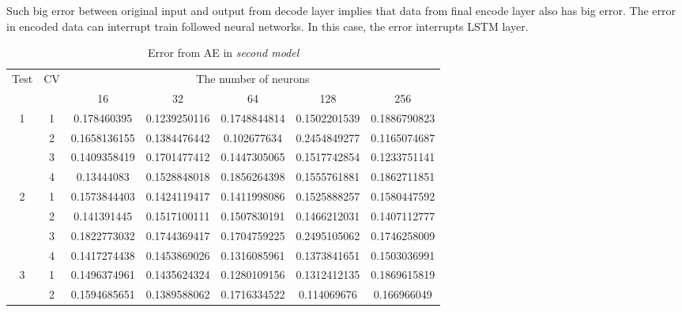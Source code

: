 \documentclass[draft,dvipsnames]{drexel-thesis}
\begin{document}
\begin{thesis}
Such big error between original input and output from decode layer implies that data from final encode layer also has big error. The error in encoded data can interrupt train followed neural networks. In this case, the error interrupts LSTM layer.


\begin{table}[!t]
\centering
\caption{Error from AE in {\em second model}}
\label{tbl:sae_error}
\begin{tabular}{|c|c|c|c|c|c|c|}
\hline
\multirow{2}{*}{Test} & \multirow{2}{*}{CV} & \multicolumn{5}{c|}{The number of neurons}                                   \\ \cline{3-7} 
                      &                     & 16            & 32            & 64            & 128           & 256          \\ \hline
\multirow{4}{*}{1}    & 1                   & 0.178460395   & 0.1239250116  & 0.1748844814  & 0.1502201539  & 0.1886790823 \\ \cline{2-7} 
                      & 2                   & 0.1658136155  & 0.1384476442  & 0.102677634   & 0.2454849277  & 0.1165074687 \\ \cline{2-7} 
                      & 3                   & 0.1409358419  & 0.1701477412  & 0.1447305065  & 0.1517742854  & 0.1233751141 \\ \cline{2-7} 
                      & 4                   & 0.13444083    & 0.1528848018  & 0.1856264398  & 0.1555761881  & 0.1862711851 \\ \hline
\multirow{4}{*}{2}    & 1                   & 0.1573844403  & 0.1424119417  & 0.1411998086  & 0.1525888257  & 0.1580447592 \\ \cline{2-7} 
                      & 2                   & 0.141391445   & 0.1517100111  & 0.1507830191  & 0.1466212031  & 0.1407112777 \\ \cline{2-7} 
                      & 3                   & 0.1822773032  & 0.1744369417  & 0.1704759225  & 0.2495105062  & 0.1746258009 \\ \cline{2-7} 
                      & 4                   & 0.1417274438  & 0.1453869026  & 0.1316085961  & 0.1373841651  & 0.1503036991 \\ \hline
\multirow{4}{*}{3}    & 1                   & 0.1496374961  & 0.1435624324  & 0.1280109156  & 0.1312412135  & 0.1869615819 \\ \cline{2-7} 
                      & 2                   & 0.1594685651  & 0.1389588062  & 0.1716334522  & 0.114069676   & 0.166966049  \\ \cline{2-7} 

\end{tabular}
\end{table}
\end{thesis}
\end{document}
